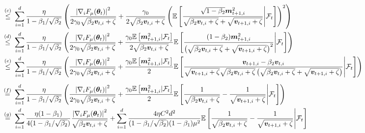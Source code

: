 \begin{appendices}
\begin{equation}
\begin{aligned}
\stackrel{(c)}{\leq}\,\,&\sum_{i=1}^d\frac{\eta}{1-\beta_1/\sqrt{\beta_2}}\left(\frac{\left|\nabla_i F_{\mu}(\vtheta_t)\right|^2}{2\gamma_0\sqrt{\beta_2\vv_{t,i} + \zeta}} + \frac{\gamma_0}{2\sqrt{\beta_2\vv_{t,i} + \zeta}}\left(\E\left[\frac{\sqrt{1-\beta_2}\vm_{t+1,i}^2 }{\sqrt{\beta_2\vv_{t,i} + \zeta} + \sqrt{\vv_{t+1,i} + \zeta}} \Bigg| \gF_t \right]\right)^2\right) \\
\stackrel{(d)}{\leq}\,\,&\sum_{i=1}^d\frac{\eta}{1-\beta_1/\sqrt{\beta_2}}\left(\frac{\left|\nabla_i F_{\mu}(\vtheta_t)\right|^2}{2\gamma_0\sqrt{\beta_2\vv_{t,i} + \zeta}} + \frac{\gamma_0 \E\left[\vm_{t+1,i}^2 | \gF_t \right]}{2\sqrt{\beta_2\vv_{t,i} + \zeta}}\E\left[\frac{(1-\beta_2)\vm_{t+1,i}^2 }{\left(\sqrt{\beta_2\vv_{t,i} + \zeta} + \sqrt{\vv_{t+1,i} + \zeta}\right)^2} \Bigg| \gF_t \right]\right) \\
\stackrel{(e)}{\leq}\,\,&\sum_{i=1}^d\frac{\eta}{1-\beta_1/\sqrt{\beta_2}}\left(\frac{\left|\nabla_i F_{\mu}(\vtheta_t)\right|^2}{2\gamma_0\sqrt{\beta_2\vv_{t,i} + \zeta}} + \frac{\gamma_0 \E\left[\vm_{t+1,i}^2 | \gF_t \right]}{2}\E\left[\frac{\vv_{t+1,i} - \beta_2\vv_{t,i}}{\sqrt{\vv_{t+1,i}+\zeta}\sqrt{\beta_2\vv_{t,i}+\zeta}\left(\sqrt{\beta_2\vv_{t,i} + \zeta} + \sqrt{\vv_{t+1,i} + \zeta}\right)} \Bigg| \gF_t \right]\right)\\[5pt]
\stackrel{(f)}{=}\,\,&\sum_{i=1}^d\frac{\eta}{1-\beta_1/\sqrt{\beta_2}}\left(\frac{\left|\nabla_i F_{\mu}(\vtheta_t)\right|^2}{2\gamma_0\sqrt{\beta_2\vv_{t,i} + \zeta}} + \frac{\gamma_0 \E\left[\vm_{t+1,i}^2 | \gF_t \right]}{2}\E\left[\frac{1}{\sqrt{\beta_2\vv_{t,i} + \zeta}} - \frac{1}{\sqrt{\vv_{t+1,i} + \zeta}} \Bigg| \gF_t \right]\right) \\
\stackrel{(g)}{=}\,\,&\sum_{i=1}^d\frac{\eta(1-\beta_1)}{4(1-\beta_1/\sqrt{\beta_2})}\frac{\left|\nabla_i F_{\mu}(\vtheta_t)\right|^2}{\sqrt{\beta_2\vv_{t,i} + \zeta}} + \sum_{i=1}^d\frac{4\eta C^2d^2}{(1-\beta_1/\sqrt{\beta_2})(1-\beta_1)\mu^2}\E\left[\frac{1}{\sqrt{\beta_2\vv_{t,i} + \zeta}} - \frac{1}{\sqrt{\vv_{t+1,i} + \zeta}} \Bigg| \gF_t \right] \label{eq:cir-2}

\end{aligned}
\end{equation}
\end{appendices}
